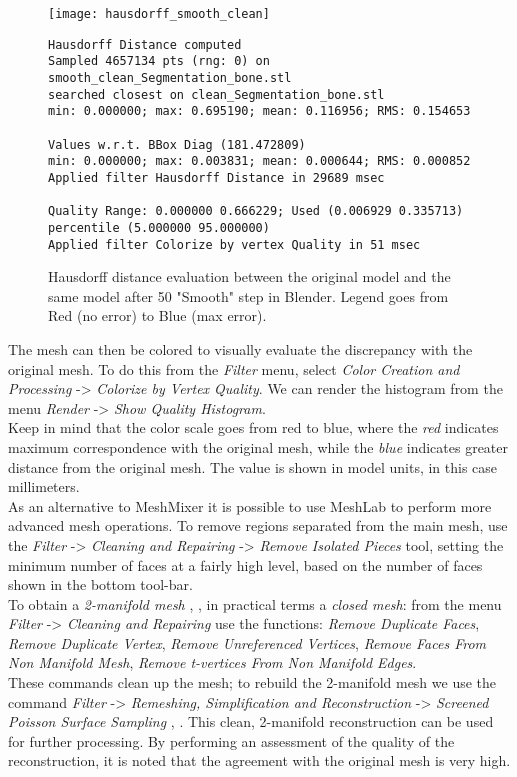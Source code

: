 \begin{figure}[h]
\centering
\texttt{[image: hausdorff\_smooth\_clean]}
\caption[LoF entry]{Hausdorff distance evaluation between the original model and the same model after 50 "Smooth" step in Blender. Legend goes from Red (no error) to Blue (max error).}

\begin{lstlisting}
Hausdorff Distance computed
Sampled 4657134 pts (rng: 0) on smooth_clean_Segmentation_bone.stl
searched closest on clean_Segmentation_bone.stl
min: 0.000000; max: 0.695190; mean: 0.116956; RMS: 0.154653

Values w.r.t. BBox Diag (181.472809)
min: 0.000000; max: 0.003831; mean: 0.000644; RMS: 0.000852 
Applied filter Hausdorff Distance in 29689 msec

Quality Range: 0.000000 0.666229; Used (0.006929 0.335713)
percentile (5.000000 95.000000) 
Applied filter Colorize by vertex Quality in 51 msec
\end{lstlisting}
\label{fig:hausdorff_smooth_clean}
\end{figure}

The mesh can then be colored to visually evaluate the discrepancy with the original mesh. To do this from the \emph{Filter} menu, select \emph{Color Creation and Processing} -> \emph{Colorize by Vertex Quality}. We can render the histogram from the menu \emph{Render} -> \emph{Show Quality Histogram}. \\
Keep in mind that the color scale goes from red to blue, where the \emph{red} indicates maximum correspondence with the original mesh, while the \emph{blue} indicates greater distance from the original mesh. The value is shown in model units, in this case millimeters. \\
As an alternative to MeshMixer it is possible to use MeshLab to perform more advanced mesh operations.
To remove regions separated from the main mesh, use the \emph{Filter} -> \emph{Cleaning and Repairing} -> \emph{Remove Isolated Pieces} tool, setting the minimum number of faces at a fairly high level, based on the number of faces shown in the bottom tool-bar. \\
To obtain a \emph{2-manifold mesh} \parencite{Reference92}, \parencite{Reference93}, in practical terms a \emph{closed mesh}: from the menu \emph{Filter} -> \emph{Cleaning and Repairing } use the functions: \emph{Remove Duplicate Faces}, \emph{Remove Duplicate Vertex}, \emph{Remove Unreferenced Vertices}, \emph{Remove Faces From Non Manifold Mesh}, \emph{Remove t-vertices From Non Manifold Edges}. \\ These commands clean up the mesh; to rebuild the 2-manifold mesh we use the command \emph{Filter} -> \emph{Remeshing, Simplification and Reconstruction} -> \emph{Screened Poisson Surface Sampling} \parencite{Reference95}, \parencite{Reference96}. This clean, 2-manifold reconstruction can be used for further processing. By performing an assessment of the quality of the reconstruction, it is noted that the agreement with the original mesh is very high.

